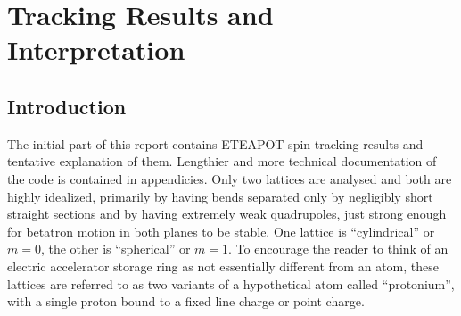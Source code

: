 \documentclass[]{article}
\begin{document}
\clearpage

\tableofcontents

\clearpage

\section{Tracking Results and Interpretation}
\subsection{Introduction}
The initial part of this report contains ETEAPOT spin tracking results
and tentative explanation of them. Lengthier and more technical 
documentation of the code is contained in appendicies. Only two
lattices are analysed and both are highly idealized, primarily
by having bends separated only by negligibly short straight sections
and by having extremely weak quadrupoles, just strong enough
for betatron motion in both planes to be stable. One lattice
is ``cylindrical'' or $m=0$, the other is ``spherical'' or $m=1$.
To encourage the reader to think of an electric accelerator storage ring
as not essentially different from an atom, these lattices are referred
to as two variants of a hypothetical atom called ``protonium'',
with a single proton bound to a fixed line charge or point charge. 
 
\end{document}
